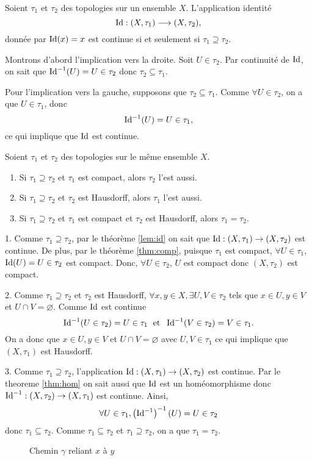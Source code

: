 \documentclass[french]{article}
\begin{document}
\begin{lemme}\label{lem:id}
  Soient $\tau_1$ et $\tau_2$ des topologies sur un ensemble $X$. L'application identité
  $$\operatorname{Id}: (X, \tau_1) \longrightarrow (X, \tau_2),$$
  donnée par $\operatorname{Id}(x) = x$ est continue si et seulement si $\tau_1 \supseteq \tau_2$.

  \tcblower
  \begin{preuve}
    Montrons d'abord l'implication vers la droite. Soit $U \in \tau_2$. Par continuité de $\operatorname{Id}$, on sait que $\operatorname{Id}^{-1}(U) = U \in \tau_2$ donc $\tau_2 \subseteq \tau_1$.
    \par Pour l'implication vers la gauche, supposons que $\tau_2 \subseteq \tau_1$. Comme $\forall U \in \tau_2$, on a que $U \in \tau_1$, donc
    $$\operatorname{Id}^{-1}(U) = U \in \tau_1,$$
    ce qui implique que $\operatorname{Id}$ est continue.
  \end{preuve}
\end{lemme}

\begin{theoreme}
  Soient $\tau_1$ et $\tau_2$ des topologies sur le même ensemble $X$.
  \begin{enumerate}
    \item Si $\tau_1 \supseteq \tau_2$ et $\tau_1$ est compact, alors $\tau_2$ l'est aussi.
    \item Si $\tau_1 \supseteq \tau_2$ et $\tau_2$ est Hausdorff, alors $\tau_1$ l'est aussi.
    \item Si $\tau_1 \supseteq \tau_2$ et $\tau_1$ est compact et $\tau_2$ est Hausdorff, alors $\tau_1 = \tau_2$.
  \end{enumerate}

  \tcblower
  \begin{preuve}
    1. Comme $\tau_1 \supseteq \tau_2$, par le théorème \ref{lem:id} on sait que $\operatorname{Id}: (X, \tau_1) \rightarrow (X, \tau_2)$ est continue. De plus, par le théorème \ref{thm:comp}, puisque $\tau_1$ est compact, $\forall U \in \tau_1$, $\operatorname{Id}(U) = U \in \tau_2$ est compact. Donc, $\forall U \in \tau_2$, $U$ est compact donc $(X, \tau_2)$ est compact.
    \par 2. Comme $\tau_1 \supseteq \tau_2$ et $\tau_2$ est Hausdorff, $\forall x, y \in X, \exists U, V \in \tau_2$ tels que $x \in U, y \in V$ et $U \cap V = \varnothing$. Comme $\operatorname{Id}$ est continue
    $$\operatorname{Id}^{-1}(U \in \tau_2) = U \in \tau_1 \; \text{ et } \; \operatorname{Id}^{-1}(V \in \tau_2) = V \in \tau_1.$$
    On a donc que $x\in U, y \in V$ et $U \cap V = \varnothing$ avec $U, V \in \tau_1$ ce qui implique que $(X, \tau_1)$ est Hausdorff.
    \par 3. Comme $\tau_1 \supseteq \tau_2$, l'application $\operatorname{Id}: (X, \tau_1) \rightarrow (X, \tau_2)$ est continue. Par le theoreme \ref{thm:hom} on sait aussi que $\operatorname{Id}$ est un homéomorphisme donc $\operatorname{Id}^{-1}: (X, \tau_2) \rightarrow (X, \tau_1)$ est continue. Ainsi,
    $$\forall U \in \tau_1, \left( \operatorname{Id}^{-1} \right)^{-1} (U) = U \in \tau_2$$
    donc $\tau_1 \subseteq \tau_2$. Comme $\tau_1 \subseteq \tau_2$ et $\tau_1 \supseteq \tau_2$, on a que $\tau_1 = \tau_2$.
  \end{preuve}
\end{theoreme}
\newpage

\begin{figure}[ht]
  \centering
  \caption{Chemin $\gamma$ reliant $x$ à $y$}
\end{figure}
\end{document}
